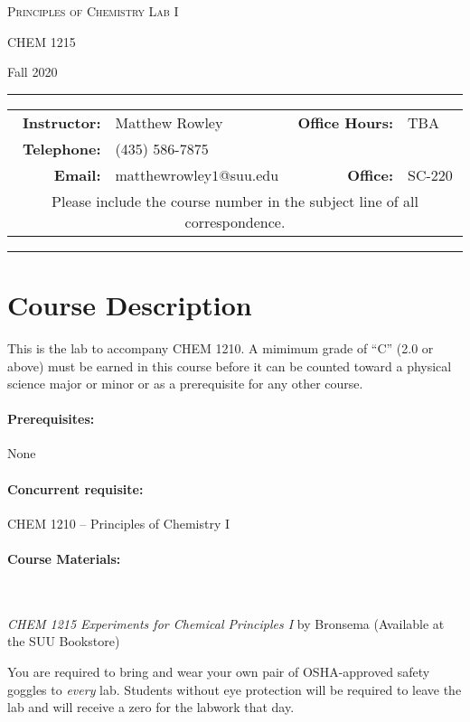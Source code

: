 \documentclass[12pt, letterpaper]{article}
\begin{document}
\begin{center}
{\Large \textsc{Principles of Chemistry Lab I}}

CHEM 1215
\end{center}
\begin{center}
	{\large Fall 2020}
\end{center}
\begin{center}
	\rule{0.97\textwidth}{0.4pt}
	\begin{tabular}{rlcrl}
		\textbf{Instructor:} & Matthew Rowley & & \textbf{Office Hours:} & TBA \\
		\textbf{Telephone:} & (435) 586-7875 & & & \\
		\textbf{Email:} & \multicolumn{2}{l}{matthewrowley$1$@suu.edu} & \textbf{Office:} & SC-220\\
		\multicolumn{5}{c}{Please include the course number in the subject line of all correspondence.} 
	\end{tabular}
	\rule{0.97\textwidth}{0.4pt}
\end{center}

\section*{Course Description} 
This is the lab to accompany CHEM 1210. A mimimum grade of ``C'' (2.0 or above) must be earned in this course before it can be counted toward a physical science major or minor or as a prerequisite for any other course.

\paragraph{Prerequisites:}
None

\paragraph{Concurrent requisite:}
CHEM 1210 -- Principles of Chemistry I

\paragraph{Course Materials:} ~

\emph{CHEM 1215 Experiments for Chemical Principles I} by Bronsema (Available at the SUU Bookstore)

You are required to bring and wear your own pair of OSHA-approved safety goggles to \emph{every} lab. Students without eye protection will be required to leave the lab and will receive a zero for the labwork that day.
\end{document}
